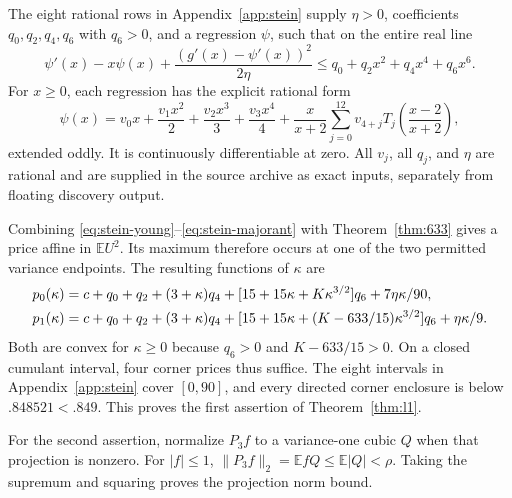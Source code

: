 \documentclass[11pt]{article}
\newcommand{\E}{\mathbb E}
\begin{document}
The eight rational rows in Appendix~\ref{app:stein} supply
$\eta>0$, coefficients $q_0,q_2,q_4,q_6$ with $q_6>0$, and a
regression $\psi$, such that on the entire real line
\begin{equation}\label{eq:stein-majorant}
 \psi'(x)-x\psi(x)+\frac{(g'(x)-\psi'(x))^2}{2\eta}
 \le q_0+q_2x^2+q_4x^4+q_6x^6.
\end{equation}
For $x\ge0$, each regression has the explicit rational form
\begin{equation}\label{eq:regression}
 \psi(x)=v_0x+\frac{v_1x^2}{2}+\frac{v_2x^3}{3}
 +\frac{v_3x^4}{4}
 +\frac{x}{x+2}\sum_{j=0}^{12}v_{4+j}
 T_j\left(\frac{x-2}{x+2}\right),
\end{equation}
extended oddly. It is continuously differentiable at zero.
All $v_j$, all $q_j$, and $\eta$ are rational and are supplied in the
source archive as exact inputs, separately from floating discovery output.

Combining \eqref{eq:stein-young}--\eqref{eq:stein-majorant} with
Theorem~\ref{thm:633} gives a price affine in $\E U^2$.
Its maximum therefore occurs at one of the two permitted variance
endpoints. The resulting functions of $\kappa$ are
\begin{align}\label{eq:cornerprices}
 p_0(\kappa)={}&c+q_0+q_2+(3+\kappa)q_4
 +[15+15\kappa+K\kappa^{3/2}]q_6+7\eta\kappa/90,\notag\\
 p_1(\kappa)={}&c+q_0+q_2+(3+\kappa)q_4
 +[15+15\kappa+(K-633/15)\kappa^{3/2}]q_6+\eta\kappa/9.
\end{align}
Both are convex for $\kappa\ge0$ because $q_6>0$ and $K-633/15>0$.
On a closed cumulant interval, four corner prices thus suffice.
The eight intervals in Appendix~\ref{app:stein} cover $[0,90]$,
and every directed corner enclosure is below $.848521<.849$.
This proves the first assertion of Theorem~\ref{thm:l1}.

For the second assertion, normalize $P_3f$ to a variance-one cubic $Q$
when that projection is nonzero. For $|f|\le1$,
$\|P_3f\|_2=\E fQ\le\E|Q|<\rho$. Taking the supremum and squaring
proves the projection norm bound.
\end{document}
